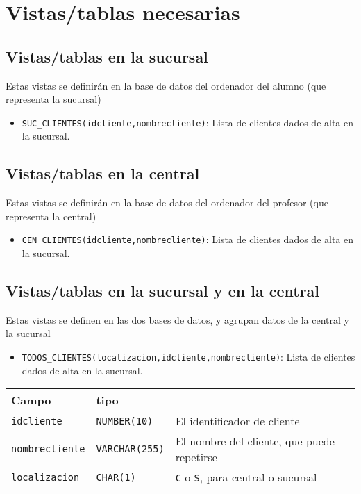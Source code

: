 \documentclass[a4paper]{article}
\begin{document}
\newpage
\section{Vistas/tablas necesarias}
\label{sec:org000000f}
\subsection{Vistas/tablas en la sucursal}
\label{sec:org0000006}
Estas vistas se definirán en la base de datos del ordenador del alumno (que representa la sucursal)
\begin{itemize}
\item \texttt{SUC\_CLIENTES(idcliente,nombrecliente)}: Lista de clientes dados de alta en la sucursal.
\end{itemize}

\subsection{Vistas/tablas en la central}
\label{sec:org0000009}
Estas vistas se definirán en la base de datos del ordenador del profesor (que representa la central)
\begin{itemize}
\item \texttt{CEN\_CLIENTES(idcliente,nombrecliente)}: Lista de clientes dados de alta en la sucursal.
\end{itemize}

\subsection{Vistas/tablas en la sucursal y en la central}
\label{sec:org000000c}
Estas vistas se definen en las dos bases de datos, y agrupan datos de la central y la sucursal
\begin{itemize}
\item \texttt{TODOS\_CLIENTES(localizacion,idcliente,nombrecliente)}: Lista de clientes dados de alta en la sucursal.
\end{itemize}


\begin{center}
\begin{tabular}{lll}
Campo & tipo & \\[0pt]
\hline
\texttt{idcliente} & \texttt{NUMBER(10)} & El identificador de cliente\\[0pt]
\texttt{nombrecliente} & \texttt{VARCHAR(255)} & El nombre del cliente, que puede repetirse\\[0pt]
\texttt{localizacion} & \texttt{CHAR(1)} & \texttt{C} o \texttt{S}, para central o sucursal\\[0pt]
\end{tabular}
\end{center}
\end{document}
